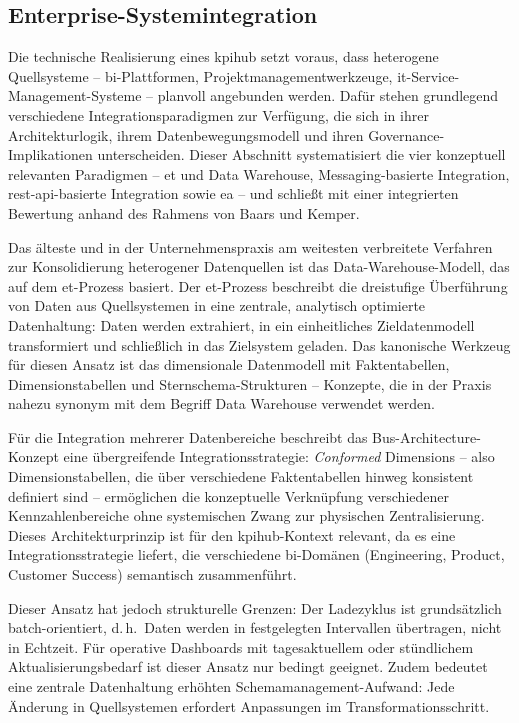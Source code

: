 
\subsection{Enterprise-Systemintegration}
\label{sec:grundlagen-integration}

Die technische Realisierung eines \gls{kpihub} setzt voraus, dass heterogene Quellsysteme -- \gls{bi}-Plattformen, Projektmanagementwerkzeuge, \gls{it}-Service-Management-Systeme -- planvoll angebunden werden.
Dafür stehen grundlegend verschiedene Integrationsparadigmen zur Verfügung, die sich in ihrer Architekturlogik, ihrem Datenbewegungsmodell und ihren Governance-Implikationen unterscheiden.
Dieser Abschnitt systematisiert die vier konzeptuell relevanten Paradigmen -- \gls{et} und Data Warehouse, Messaging-basierte Integration, \gls{rest}-\gls{api}-basierte Integration sowie \gls{ea} -- und schließt mit einer integrierten Bewertung anhand des Rahmens von Baars und Kemper.

Das älteste und in der Unternehmenspraxis am weitesten verbreitete Verfahren zur Konsolidierung heterogener Datenquellen ist das Data-Warehouse-Modell, das auf dem \gls{et}-Prozess basiert.
Der \gls{et}-Prozess beschreibt die dreistufige Überführung von Daten aus Quellsystemen in eine zentrale, analytisch optimierte Datenhaltung: Daten werden extrahiert, in ein einheitliches Zieldatenmodell transformiert und schließlich in das Zielsystem geladen.
Das kanonische Werkzeug für diesen Ansatz ist das dimensionale Datenmodell mit Faktentabellen, Dimensionstabellen und Sternschema-Strukturen -- Konzepte, die in der Praxis nahezu synonym mit dem Begriff Data Warehouse verwendet werden.

Für die Integration mehrerer Datenbereiche beschreibt das Bus-Architecture-Konzept eine übergreifende Integrationsstrategie: \textit{Conformed} Dimensions -- also Dimensionstabellen, die über verschiedene Faktentabellen hinweg konsistent definiert sind -- ermöglichen die konzeptuelle Verknüpfung verschiedener Kennzahlenbereiche ohne systemischen Zwang zur physischen Zentralisierung.
Dieses Architekturprinzip ist für den \gls{kpihub}-Kontext relevant, da es eine Integrationsstrategie liefert, die verschiedene \gls{bi}-Domänen (Engineering, Product, Customer Success) semantisch zusammenführt.

Dieser Ansatz hat jedoch strukturelle Grenzen: Der Ladezyklus ist grundsätzlich batch-orientiert, d.\,h.\ Daten werden in festgelegten Intervallen übertragen, nicht in Echtzeit.
Für operative Dashboards mit tagesaktuellem oder stündlichem Aktualisierungsbedarf ist dieser Ansatz nur bedingt geeignet.
Zudem bedeutet eine zentrale Datenhaltung erhöhten Schemamanagement-Aufwand: Jede Änderung in Quellsystemen erfordert Anpassungen im Transformationsschritt.

